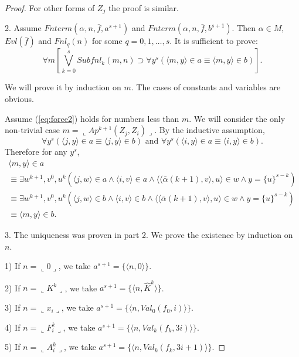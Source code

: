 \documentclass{asl}
\theoremstyle{definition}
\begin{document}
\begin{proof}
For other forms of $Z_j$ the proof is similar.

2. Assume $Fnterm(\alpha,n,\bar{f},a^{s+1})$ and $ Fnterm(\alpha,n,\bar{f},b^{s+1})$. Then $\alpha\in M$, $Evl(\bar{f})$ and $Fnl_q(n)$ for some $q=0,1,\dots,s$. It is sufficient to prove:
\begin{equation}
\forall m\left[\bigvee_{k=0}^s Subfnl_k(m,n)\supset \forall y^s(\langle m,y\rangle\in a\equiv\langle m,y\rangle\in b)\right].
\label{eq:force2}
\end{equation}

We will prove it by induction on $m$. The cases of constants and variables are obvious.

Assume (\ref{eq:force2}) holds for numbers less than $m$. We will consider the only non-trivial case $m=\llcorner Ap^{k+1}(Z_j, Z_i)\lrcorner$. By the inductive assumption, 
\[\forall y^s(\langle j,y\rangle\in a\equiv\langle j,y\rangle\in b)\text{ and }
\forall y^s(\langle i,y\rangle\in a\equiv\langle i,y\rangle\in b).\]
Therefore for any $y^s$,
\begin{multline*}
\langle m,y\rangle\in a
\\
\equiv
\exists w^{k+1}, v^0,u^{k}\left(\langle j,w\rangle\in a\wedge \langle i,v\rangle\in a
\wedge\langle\langle\bar{\alpha}(k+1),v\rangle,u\rangle\in w\wedge y=\lbrace u\rbrace^{s-k}\right)
\\
\equiv
\exists w^{k+1}, v^0,u^{k}\left(\langle j,w\rangle\in b\wedge \langle i,v\rangle\in b
\wedge\langle\langle\bar{\alpha}(k+1),v\rangle,u\rangle\in w\wedge y=\lbrace u\rbrace^{s-k}\right)
\\
\equiv\langle m,y\rangle\in b.
\end{multline*}

3. The uniqueness was proven in part 2. We prove the existence by induction on $n$.

1) If $n=\llcorner 0\lrcorner$, we take $a^{s+1}=\lbrace \langle n,0\rangle\rbrace$. 
\smallskip

2) If $n=\llcorner K^k\lrcorner$, we take $a^{s+1}=\lbrace \langle n,\hat{K}^k\rangle\rbrace$. 
\smallskip

3) If $n=\llcorner x_i\lrcorner$, we take $a^{s+1}=\lbrace \langle n,Val_0(f_0,i)\rangle\rbrace$.
\smallskip

4) If $n=\llcorner F_i^k\lrcorner$, we take $a^{s+1}=\lbrace \langle n,Val_k(f_k,3i)\rangle\rbrace$.  
\smallskip

5) If $n=\llcorner A_i^k\lrcorner$, we take $a^{s+1}=\lbrace \langle n,Val_k(f_k,3i+1)\rangle\rbrace$.  
\smallskip


\end{proof}
\end{document}
